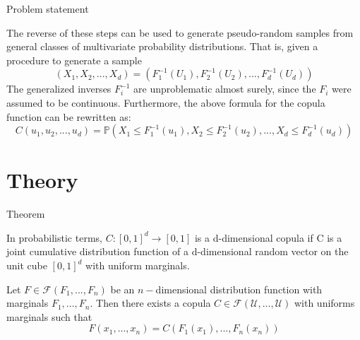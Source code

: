 \documentclass[aspectratio=169, 12pt]{beamer}
\begin{document}
\begin{frame}{Problem statement}
    \begin{definition}
      The reverse of these steps can be used to generate pseudo-random samples from general classes of multivariate probability distributions. That is, given a procedure to generate a sample 
      $$
      (X_1, X_2, ..., X_d) = (F_1^{-1}(U_1), F_2^{-1}(U_2), ..., F_d^{-1}(U_d))
      $$
      The generalized inverses $F_i^{-1}$ are unproblematic almost surely, since the $F_i$ were assumed to be continuous. Furthermore, the above formula for the copula function can be rewritten as:
      $$
      C(u_1, u_2, ..., u_d) = \mathbb{P}(X_1 \leq F_1^{-1}(u_1), X_2 \leq F_2^{-1}(u_2), ..., X_d \leq F_d^{-1}(u_d))
      $$
    \end{definition}
\end{frame}


\section{Theory}
\begin{frame}{Theorem}
\begin{definition}
        In probabilistic terms, $C: [0, 1]^d \rightarrow [0, 1]$ is a d-dimensional copula if C is a joint cumulative distribution function of a d-dimensional random vector on the unit cube $[0, 1]^{d}$ with uniform marginals.
\end{definition}
 \begin{theorem}
 Let $F \in \mathcal{F} (F_1, ..., F_n)$ be an $n-$dimensional distribution function with marginals $F_1, ..., F_n$. Then there exists a copula $C \in \mathcal{F}(\mathcal{U}, ..., \mathcal{U})$ with uniforms marginals such that
 $$
 F(x_1, ..., x_n) = C(F_1(x_1), ..., F_n(x_n))
 $$
 \end{theorem}
\end{frame}
\end{document}
